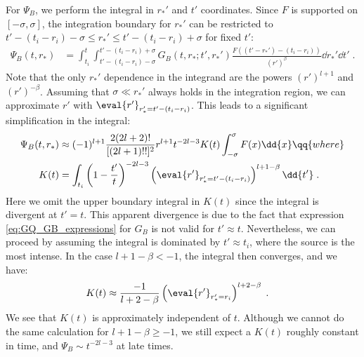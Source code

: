 \label{sec:Psi_B_details}
For $\Psi_B$, we perform the integral in $r_*'$ and $t'$ coordinates.
Since $F$ is supported on $[-\sigma,\sigma]$, the integration boundary for $r_*'$ can be restricted to $t'-(t_i-r_i)-\sigma \leq r_*' \leq t'-(t_i-r_i)+\sigma$ for fixed $t'$:
\begin{align}
  \Psi_B(t,r_*) &= \int_{t_i}^t \int_{t'-(t_i-r_i)-\sigma}^{t'-(t_i-r_i)+\sigma}  G_B(t,r_*;t',r_*') \frac{F((t'-r_*')-(t_i-r_i))}{(r')^\beta} \dd{r_*'} \dd{t'}  \;.
\end{align}
Note that the only $r_*'$ dependence in the integrand are the powers $(r')^{l+1}$ and $(r')^{-\beta}$.
Assuming that $\sigma \ll r_*'$ always holds in the integration region, we can approximate $r'$ with $\eval{r'}_{r_*'=t'-(t_i-r_i)}$.
This leads to a significant simplification in the integral:
\begin{align}
  \Psi_B(t,r_*) &\approx (-1)^{l+1} \frac{2(2l+2)!}{[(2l+1)!!]^2} r^{l+1} t^{-2l-3}  K(t) \int_{-\sigma}^{\sigma} F(x) \dd{x} \qq{where} \nonumber \\
  K(t) &= \int_{t_i} \left(1-\frac{t'}{t}\right)^{-2l-3} \left(\eval{r'}_{r_*'=t'-(t_i-r_i)}\right)^{l+1-\beta}   \dd{t'} \;.
  \end{align}
Here we omit the upper boundary integral in $K(t)$ since the integral is divergent at $t' = t$.
This apparent divergence is due to the fact that expression \eqref{eq:GQ_GB_expressions} for $G_B$ is not valid for $t'\approx t$.
Nevertheless, we can proceed by assuming the integral is dominated by $t' \approx t_i$, where the source is the most intense.
In the case $l+1-\beta<-1$, the integral then converges, and we have:
\begin{align}
  K(t) &\approx \frac{-1}{l+2-\beta} \left(\eval{r'}_{r_*'=r_i}\right)^{l+2-\beta}  \;.
\end{align}
We see that $K(t)$ is approximately independent of $t$.
Although we cannot do the same calculation for $l+1-\beta \geq -1$, we still expect a $K(t)$ roughly constant in time, and $\Psi_B \sim t^{-2l-3}$ at late times.




\label{sec:rsh_couplings}

